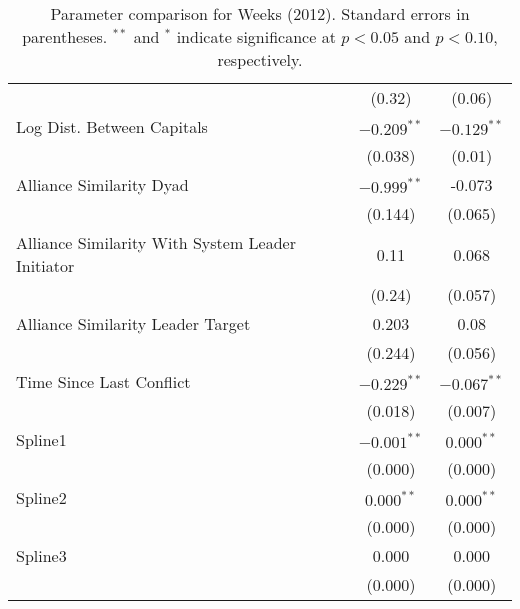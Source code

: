 \begin{table}[ht]
\begin{tabular}{lcc}
   & (0.32) & (0.06) \\ 
  Log Dist. Between Capitals & $-0.209^{\ast\ast}$ & $-0.129^{\ast\ast}$ \\ 
   & (0.038) & (0.01) \\ 
  Alliance Similarity Dyad  & $-0.999^{\ast\ast}$ & -0.073 \\ 
   & (0.144) & (0.065) \\ 
  Alliance Similarity With System Leader Initiator & 0.11 & 0.068 \\ 
   & (0.24) & (0.057) \\ 
  Alliance Similarity Leader Target & 0.203 & 0.08 \\ 
   & (0.244) & (0.056) \\ 
  Time Since Last Conflict & $-0.229^{\ast\ast}$ & $-0.067^{\ast\ast}$ \\ 
   & (0.018) & (0.007) \\ 
  Spline1 & $-0.001^{\ast\ast}$ & $0.000^{\ast\ast}$ \\ 
   & (0.000) & (0.000) \\ 
  Spline2 & $0.000^{\ast\ast}$ & $0.000^{\ast\ast}$ \\ 
   & (0.000) & (0.000) \\ 
  Spline3 & 0.000 & 0.000 \\ 
   & (0.000) & (0.000) \\ 
   \hline
\hline
\end{tabular}
\endgroup
\caption{Parameter comparison for Weeks (2012). Standard errors in parentheses. $^{**}$ and $^{*}$ indicate significance at $p<0.05$ and $p<0.10$, respectively.} 
\label{tab:weeks_coef}
\end{table}
